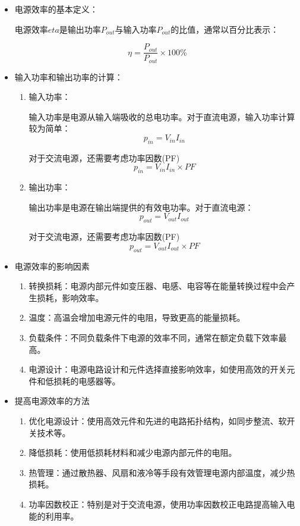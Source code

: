 \documentclass[dvipsnames, svgnames,a4paper,11pt]{article}
\begin{document}
			\begin{itemize}
				\item 电源效率的基本定义：
					
					电源效率$eta$是输出功率$P_{out}$与输入功率$P_{out}$的比值，通常以百分比表示：

					\[
						\eta = \frac{P_{out}}{P_{out}} \times 100\%
					\]

				\item 输入功率和输出功率的计算：
				
					\begin{enumerate}
						\item 输入功率：
						
							输入功率是电源从输入端吸收的总电功率。对于直流电源，输入功率计算较为简单：
							\[
								p_{in} = V_{in}I_{in}
							\]
		
							对于交流电源，还需要考虑功率因数(PF)
							\[
								p_{in} = V_{in}I_{in} \times PF
							\]

						
						\item 输出功率：
						
							输出功率是电源在输出端提供的有效电功率。对于直流电源：
							\[
								p_{out} = V_{out}I_{out}
							\]
		
							对于交流电源，还需要考虑功率因数(PF)
							\[
								p_{out} = V_{out}I_{out} \times PF
							\]

						
					\end{enumerate}
					
				
				\item 电源效率的影响因素
				
					\begin{enumerate}
						\item 转换损耗：电源内部元件如变压器、电感、电容等在能量转换过程中会产生损耗，影响效率。
						\item 温度：高温会增加电源元件的电阻，导致更高的能量损耗。
						\item 负载条件：不同负载条件下电源的效率不同，通常在额定负载下效率最高。
						\item 电源设计：电源电路设计和元件选择直接影响效率，如使用高效的开关元件和低损耗的电感器等。
					\end{enumerate}
				
				\item 提高电源效率的方法
				
					\begin{enumerate}
						\item 优化电源设计：使用高效元件和先进的电路拓扑结构，如同步整流、软开关技术等。
						\item 降低损耗：使用低损耗材料和减少电源内部元件的电阻。
						\item 热管理：通过散热器、风扇和液冷等手段有效管理电源内部温度，减少热损耗。
						\item 功率因数校正：特别是对于交流电源，使用功率因数校正电路提高输入电能的利用率。
					\end{enumerate}

			\end{itemize}
\end{document}
